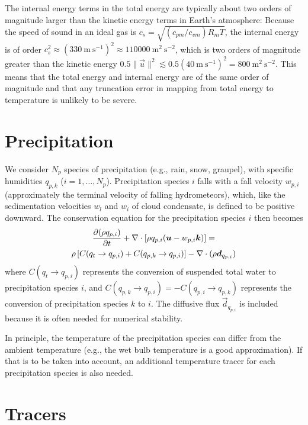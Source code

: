 \documentclass{report}
\begin{document}
The internal energy terms in the total energy are typically about two orders of magnitude larger than the kinetic energy terms in Earth's atmosphere: Because the speed of sound in an ideal gas is $c_s = \sqrt{(c_{pm}/c_{vm}) R_m T}$, the internal energy is of order $c_s^2 \approx (330~\mathrm{m~s^{-1}})^2 \approx 110000~\mathrm{m^2~s^{-2}}$, which is two orders of magnitude greater than the kinetic energy $0.5 \|\vec{u}\|^2 \lesssim 0.5(40~\mathrm{m~s^{-1}})^2 = 800~\mathrm{m^2~s^{-2}}$. This means that the total energy and internal energy are of the same order of magnitude and that any truncation error in mapping from total energy to temperature is unlikely to be severe.

\section{Precipitation}

We  consider $N_p$ species of precipitation (e.g., rain, snow, graupel), with specific humidities $q_{p,k}$ ($i=1,\dots,N_p$). Precipitation species $i$ falls with a fall velocity $w_{p,i}$ (approximately the terminal velocity of falling hydrometeors), which, like the sedimentation velocities $w_l$ and $w_i$ of cloud condensate, is defined to be positive downward. The conservation equation for the precipitation species $i$ then becomes
\begin{multline}
\frac{\partial (\rho q_{p,i})}{\partial t} + \nabla \cdot \left[\rho q_{p,i} (\boldsymbol{{u}} - w_{p,i} \boldsymbol{{k}}) \right] =\\
\rho \left[C(q_t \rightarrow q_{p,i}) + C(q_{p,k} \rightarrow q_{p,i}) \right] -\nabla \cdot (\rho \boldsymbol{{d}}_{q_{p, i}})
\label{eq:precip}
\end{multline}
where $C(q_t \rightarrow q_{p,i})$ represents the conversion of suspended total water to precipitation species $i$, and $C(q_{p,k} \rightarrow q_{p,i}) = -C(q_{p,i} \rightarrow q_{p,k})$ represents the conversion of precipitation species $k$ to $i$. The diffusive flux $\vec{d}_{q_{p, i}}$ is included because it is often needed for numerical stability.

In principle, the temperature of the precipitation species can differ from the ambient temperature (e.g., the wet bulb temperature is a good approximation). If that is to be taken into account, an additional temperature tracer for each precipitation species is also needed.

\section{Tracers}
\end{document}

